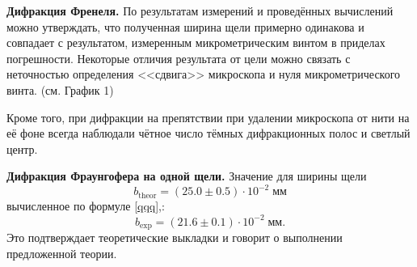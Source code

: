 \documentclass[a4paper,12pt]{article}
\theoremstyle{definition}
\begin{document}
\textbf{Дифракция Френеля.} По результатам измерений и проведённых вычислений можно утверждать, что полученная ширина щели примерно одинакова и совпадает с результатом, измеренным микрометрическим винтом в приделах погрешности. Некоторые отличия результата от цели можно связать с неточностью определения <<сдвига>> микроскопа и нуля микрометрического винта. (см. График 1)

Кроме того, при дифракции на препятствии при удалении микроскопа от нити на её фоне всегда наблюдали чётное число тёмных дифракционных полос и светлый центр.

\textbf{Дифракция Фраунгофера на одной щели.} Значение для ширины щели
\begin{equation}
\boxed{b_\text{theor} =  (25.0 \pm 0.5) \cdot 10^{-2} \; \text{мм}} 
\end{equation}
вычисленное по формуле \eqref{qqq},:
\begin{equation}\label{key}
\boxed{b_\text{exp} =  (21.6 \pm 0.1) \cdot 10^{-2} \; \text{мм}.} 
\end{equation}
Это подтверждает теоретические выкладки и говорит о выполнении предложенной теории.
\end{document}
